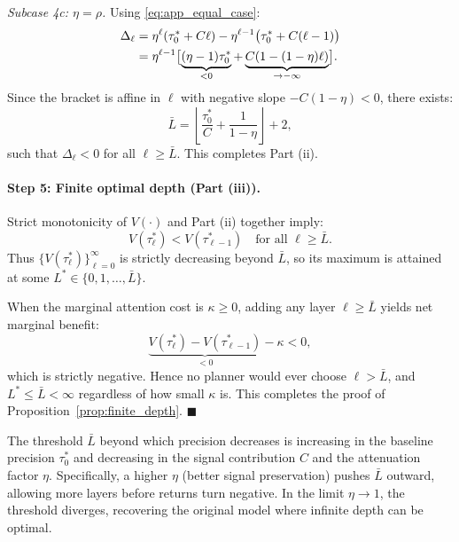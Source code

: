 \textit{Subcase 4c: $\eta = \rho$.} Using \eqref{eq:app_equal_case}:
\begin{align}
\Delta_{\ell} &= \eta^{\ell}(\tau^{*}_{0} + C\ell) - \eta^{\ell-1}\bigl(\tau^{*}_{0} + C(\ell-1)\bigr) \notag \\
&= \eta^{\ell-1}\bigl[\underbrace{(\eta-1)\tau^{*}_{0}}_{< 0} + \underbrace{C(1 - (1-\eta)\ell)}_{\to -\infty}\bigr].
\end{align}
Since the bracket is affine in $\ell$ with negative slope $-C(1-\eta) < 0$, there exists:
\begin{equation}
\bar{L} = \left\lfloor\frac{\tau^{*}_{0}}{C} + \frac{1}{1-\eta}\right\rfloor + 2,
\end{equation}
such that $\Delta_{\ell} < 0$ for all $\ell \geq \bar{L}$. This completes Part (ii).

\paragraph{Step 5: Finite optimal depth (Part (iii)).}
Strict monotonicity of $V(\cdot)$ and Part (ii) together imply:
\begin{equation}
V(\tau^{*}_{\ell}) < V(\tau^{*}_{\ell-1}) \quad \text{for all } \ell \geq \bar{L}.
\end{equation}
Thus $\{V(\tau^{*}_{\ell})\}_{\ell=0}^{\infty}$ is strictly decreasing beyond $\bar{L}$, so its maximum is attained at some $L^{*} \in \{0, 1, \ldots, \bar{L}\}$.

When the marginal attention cost is $\kappa \geq 0$, adding any layer $\ell \geq \bar{L}$ yields net marginal benefit:
\begin{equation}
\underbrace{V(\tau^{*}_{\ell}) - V(\tau^{*}_{\ell-1})}_{< 0} - \kappa < 0,
\end{equation}
which is strictly negative. Hence no planner would ever choose $\ell > \bar{L}$, and $L^{*} \leq \bar{L} < \infty$ regardless of how small $\kappa$ is. This completes the proof of Proposition~\ref{prop:finite_depth}. \hfill $\blacksquare$

\vspace{1.5em}
\begin{remark}
The threshold $\bar{L}$ beyond which precision decreases is increasing in the baseline precision $\tau^{*}_{0}$ and decreasing in the signal contribution $C$ and the attenuation factor $\eta$. Specifically, a higher $\eta$ (better signal preservation) pushes $\bar{L}$ outward, allowing more layers before returns turn negative. In the limit $\eta \to 1$, the threshold diverges, recovering the original model where infinite depth can be optimal.
\end{remark}

